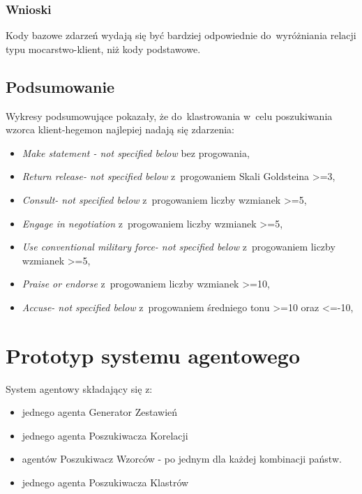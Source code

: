 \documentclass[11pt]{report}
\begin{document}
    \subsubsection{Wnioski}
    Kody bazowe zdarzeń wydają się być bardziej odpowiednie do~wyróżniania relacji typu mocarstwo-klient, niż kody podstawowe.

    \subsection{Podsumowanie}

    Wykresy podsumowujące pokazały, że do~klastrowania w~celu poszukiwania wzorca klient-hegemon najlepiej nadają się zdarzenia:
    \begin{itemize}
        \item \textit{Make statement - not specified below} bez progowania,
        \item \textit{Return release- not specified below} z~progowaniem Skali Goldsteina >=3,
        \item \textit{Consult- not specified below} z~progowaniem liczby wzmianek >=5,
        \item \textit{Engage in negotiation} z~progowaniem liczby wzmianek >=5,
        \item \textit{Use conventional military force- not specified below} z~progowaniem liczby wzmianek >=5,
        \item \textit{Praise or endorse} z~progowaniem liczby wzmianek >=10,
        \item \textit{Accuse- not specified below} z~progowaniem średniego tonu >=10 oraz <=-10,
    \end{itemize}


    \section{Prototyp systemu agentowego}

    System agentowy składający się z:
    \begin{itemize}
        \item jednego agenta Generator Zestawień
        \item jednego agenta Poszukiwacza Korelacji
        \item agentów Poszukiwacz Wzorców - po jednym dla każdej kombinacji państw.
        \item jednego agenta Poszukiwacza Klastrów
    \end{itemize}
\end{document}
